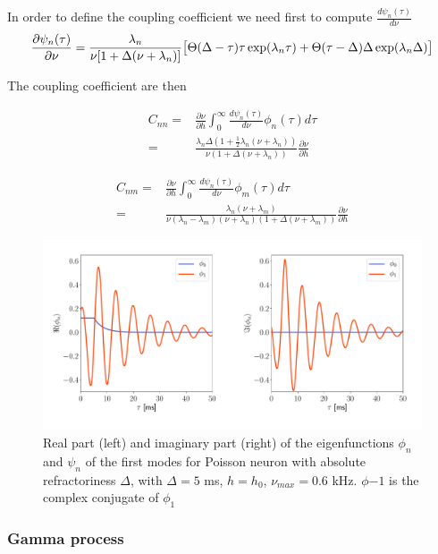 \documentclass[12pt,twoside]{report}
\begin{document}
In order to define the coupling coefficient we need first to compute $\frac{d\psi_n(\tau)}{d\nu}$ 
\begin{equation}
\frac{\partial\psi_n(\tau)}{\partial\nu}=\frac{\lambda_n}{\nu[1+\Delta(\nu+\lambda_n)]}\big[\Theta(\Delta-\tau)\tau\exp(\lambda_n\tau) +  \Theta(\tau-\Delta)\Delta \exp(\lambda_n\Delta)\big]\\
\end{equation}

The coupling coefficient are then 

\begin{align}
C_{nn}=&\frac{\partial \nu}{\partial h}\int_0^\infty\frac{d\psi_n(\tau)}{d\nu}\phi_n(\tau)d\tau \nonumber\\
=&\frac{\lambda_n\Delta(1+\frac{1}{2}\lambda_n(\nu+\lambda_n))}{\nu(1+\Delta(\nu+\lambda_n))}\frac{\partial \nu}{\partial h}
\end{align}


\begin{align}
C_{nm}=&\frac{\partial \nu}{\partial h}\int_0^\infty\frac{d\psi_n(\tau)}{d\nu}\phi_m(\tau)d\tau \nonumber\\
=&\frac{\lambda_n(\nu+\lambda_m)}{\nu(\lambda_n-\lambda_m)(\nu+\lambda_n)(1+\Delta(\nu+\lambda_m))}\frac{\partial \nu}{\partial h}
\end{align}


\begin{figure}[h!]
	\centering
	\includegraphics[width=0.8\linewidth]{poisson_eigenfunction2.pdf}
	\caption{Real part (left) and imaginary part (right) of the eigenfunctions $\phi_n$ and $\psi_n$ of the first modes for Poisson neuron with absolute refractoriness $\Delta$, with $\Delta=5$ ms, $h=h_0$, $\nu_{max}=0.6$ kHz. $\phi{-1}$ is the complex conjugate of $\phi_{1}$}
	\label{fig:poissoneigenfunction}
\end{figure}


\subsubsection{Gamma process}
\end{document}

